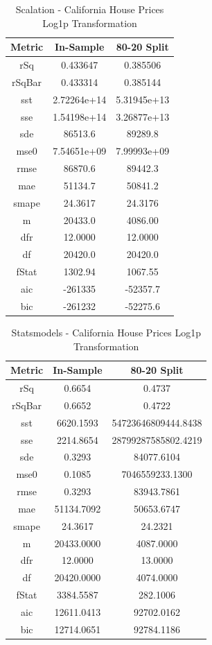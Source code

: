 \documentclass{article}
\begin{document}
\begin{table}[H]
\centering
\caption{Scalation - California House Prices Log1p Transformation}
\label{tab:Scalation - House Prices Log1p Transformation}
\begin{tabular}{|c|c|c|} \hline 
Metric & In-Sample & 80-20 Split \\ \hline \hline 
rSq &0.433647 & 0.385506 \\ \hline 
rSqBar &0.433314 &      0.385144 \\ \hline 
sst &2.72264e+14 &      5.31945e+13 \\ \hline 
sse &1.54198e+14 &      3.26877e+13 \\ \hline 
sde &86513.6 &  89289.8 \\ \hline 
mse0 &7.54651e+09 &     7.99993e+09 \\ \hline 
rmse &86870.6 & 89442.3 \\ \hline 
mae &51134.7 &  50841.2 \\ \hline 
smape &24.3617 &        24.3176 \\ \hline 
m &20433.0 &    4086.00 \\ \hline 
dfr &12.0000 &  12.0000 \\ \hline 
df &20420.0 &   20420.0 \\ \hline 
fStat &1302.94 &        1067.55 \\ \hline 
aic &-261335 &  -52357.7 \\ \hline 
bic &-261232 &  -52275.6 \\ \hline 
\end{tabular}
\end{table}

\begin{table}[H]
\centering
\caption{Statsmodels - California House Prices Log1p Transformation}
\label{tab:Statsmodels - House Prices Log1p Transformation}
\begin{tabular}{|c|c|c|}\hline
Metric & In-Sample & 80-20 Split \\ \hline \hline
rSq & 0.6654 & 0.4737 \\ \hline
rSqBar & 0.6652 & 0.4722 \\ \hline
sst & 6620.1593 & 54723646809444.8438 \\ \hline
sse & 2214.8654 & 28799287585802.4219 \\ \hline
sde & 0.3293 & 84077.6104 \\ \hline
mse0 & 0.1085 & 7046559233.1300 \\ \hline
rmse & 0.3293 & 83943.7861 \\ \hline
mae & 51134.7092 & 50653.6747 \\ \hline
smape & 24.3617 & 24.2321 \\ \hline
m & 20433.0000 & 4087.0000 \\ \hline
dfr & 12.0000 & 13.0000 \\ \hline
df & 20420.0000 & 4074.0000 \\ \hline
fStat & 3384.5587 & 282.1006 \\ \hline
aic & 12611.0413 & 92702.0162 \\ \hline
bic & 12714.0651 & 92784.1186 \\ \hline
\end{tabular}
\end{table}
\end{document}
